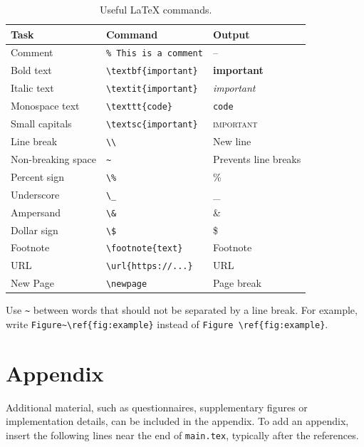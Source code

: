 \begin{table}[ht]
\centering
\begin{tabular}{lll}
\toprule
Task & Command & Output\\
\midrule
Comment & \texttt{\% This is a comment} & --\\
Bold text & \texttt{\textbackslash textbf\{important\}} & \textbf{important}\\
Italic text & \texttt{\textbackslash textit\{important\}} & \textit{important}\\
Monospace text & \texttt{\textbackslash texttt\{code\}} & \texttt{code}\\
Small capitals & \texttt{\textbackslash textsc\{important\}} & \textsc{important}\\
Line break & \texttt{\textbackslash\textbackslash} & New line\\
Non-breaking space & \texttt{\textasciitilde} & Prevents line breaks\\
Percent sign & \texttt{\textbackslash\%} & \%\\
Underscore & \texttt{\textbackslash\_} & \_\\
Ampersand & \texttt{\textbackslash\&} & \&\\
Dollar sign & \texttt{\textbackslash\$} & \$\\
Footnote & \texttt{\textbackslash footnote\{text\}} & Footnote\\
URL & \texttt{\textbackslash url\{https://...\}} & URL\\
New Page & \texttt{\textbackslash newpage} & Page break\\
\bottomrule
\end{tabular}
\caption{Useful \LaTeX{} commands.}
\label{tab:tips}
\end{table}

Use \texttt{\textasciitilde} between words that should not be separated by a line break. For example, write \texttt{Figure\textasciitilde\textbackslash ref\{fig:example\}} instead of \texttt{Figure \textbackslash ref\{fig:example\}}.


\section{Appendix}


Additional material, such as questionnaires, supplementary figures or implementation details, can be included in the appendix. To add an appendix, insert the following lines near the end of \texttt{main.tex}, typically after the references.


